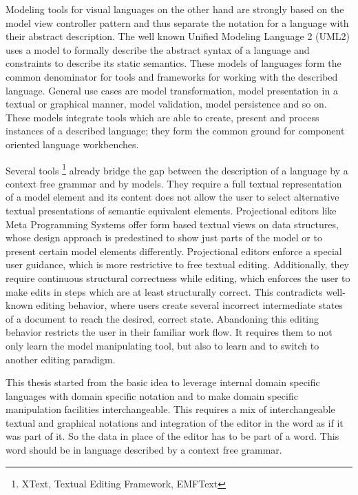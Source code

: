 Modeling tools for visual languages on the other hand are strongly based on the model view controller pattern and thus separate the notation for a language with their abstract description. The well known Unified Modeling Language 2 (UML2) uses a model to formally describe the abstract syntax of a language and constraints to describe its static semantics. These models of languages form the common denominator for tools and frameworks for working with the described language. General use cases are model transformation, model presentation in a textual or graphical manner, model validation, model persistence and so on. These models integrate tools which are able to create, present and process instances of a described language; they form the common ground for component oriented language workbenches. 

Several tools \footnote{\raggedright XText, Textual Editing Framework, EMFText} already bridge the gap between the description of a language by a context free grammar and by models. They require a full textual representation of a model element and its content does not allow the user to select alternative textual presentations of semantic equivalent elements. Projectional editors like Meta Programming Systems offer form based textual views on data structures, whose design approach is predestined to show just parts of the model or to present certain model elements differently. Projectional editors enforce a special user guidance, which is more restrictive to free textual editing. Additionally, they require continuous structural correctness while editing, which enforces the user to make edits in steps which are at least structurally correct. This contradicts well-known editing behavior, where users create several incorrect intermediate states of a document to reach the desired, correct state. Abandoning this editing behavior restricts the user in their familiar work flow. It requires them to not only learn the model manipulating tool, but also to learn and to switch to another editing paradigm. 

This thesis started from the basic idea to leverage internal domain specific languages with domain specific notation and to make domain specific manipulation facilities interchangeable. This requires a mix of interchangeable textual and graphical notations and integration of the editor in the word as if it was part of it. So the data in place of the editor has to be part of a word. This word should be in language described by a context free grammar.
 
